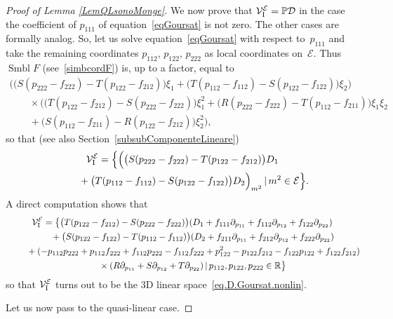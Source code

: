 \documentclass[10pt,a4paper]{amsart}
\newcommand{\D}{\mathcal{D}}
\newcommand{\MM}{\mathcal{V}_{\textrm{\normalfont I}}}
\newcommand{\E}{\mathcal{E}}
\renewcommand{\P}{\mathbb{P}}
\numberwithin{equation}{section}
\begin{document}
\begin{proof}[Proof of Lemma \ref{LemQLsonoMonge}]
We now prove that $\MM^\E=\P\D$ in the case the coef\/f\/icient of $p_{111}$ of equation~\eqref{eqGoursat} is not zero. The other cases are formally analog. So, let us solve equation~\eqref{eqGoursat} with respect to~$p_{111}$ and take the remaining coordinates $p_{112}$, $p_{122}$, $p_{222}$ as local coordinates on~$\E$. Thus~$\operatorname{Smbl} F$ (see~\eqref{simbcordF}) is, up to a factor, equal to
\begin{gather}
\Big(\big(S(p_{222}-f_{222})-T(p_{122}-f_{212})\big)\xi_1+\big(T(p_{112}-f_{112})-S(p_{122}-f_{122})\big)\xi_2\Big)\nonumber \\
\qquad{}\times \Big(\big(T(p_{122}-f_{212})-S(p_{222}-f_{222})\big)\xi_1^2
+\big(R(p_{222}-f_{222})-T(p_{112}-f_{211})\big)\xi_1\xi_2\nonumber\\
\qquad{}+\big(S(p_{112}-f_{211})-R(p_{122}-f_{212})\big)\xi_2^2\Big),\label{eqSimboloPazzesco}
\end{gather}
so that (see also Section~\ref{subsubComponenteLineare})
\begin{gather}
 \MM^\E =\Big\{\Big(\big(S(p_{222}-f_{222})-T(p_{122}-f_{212})\big)D_1
 \nonumber\\
\hphantom{\MM^\E =}{} + \big(T(p_{112}-f_{112})-S(p_{122}-f_{122})\big)D_2\Big)_{m^2} \,|\, m^2\in\E\Big\}.\label{eq.V1.Goursat.nonlin}
\end{gather}
A direct computation shows that
\begin{gather*}
 \MM^\E=\big\{\big(T(p_{122}-f_{212})-S(p_{222}-f_{222})\big)(D_1 + f_{111}\partial_{p_{11}} + f_{112}\partial_{p_{12}} + f_{122}\partial_{p_{22}})
\\
\hphantom{\MM^\E=}{} +
\big(S(p_{122}-f_{122})-T(p_{112}-f_{112})\big)(D_2 + f_{211}\partial_{p_{11}} + f_{212}\partial_{p_{12}} + f_{222}\partial_{p_{22}})
\\
\hphantom{\MM^\E=}{}
+ (-p_{112}p_{222}+p_{112}f_{222}+f_{112}p_{222}-f_{112}f_{222}
+p_{122}^2-p_{122}f_{212}-f_{122}p_{122}+f_{122}f_{212})\! \\
\hphantom{\MM^\E=}{}
\times (R\partial_{p_{11}}+S\partial_{p_{12}}+T\partial_{p_{22}})\,|\,
p_{112},p_{122},p_{222}\in\mathbb{R}
\big\}%
\end{gather*}
so that $ \MM^\E$ turns out to be the 3D linear space~\eqref{eq.D.Goursat.nonlin}.

Let us now pass to the quasi-linear case.


\end{proof}
\end{document}
